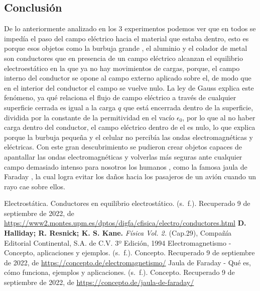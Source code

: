 \documentclass[]{article}
\begin{document}
\begin{multicols*}{2}


\section*{Conclusión}
De lo anteriormente analizado en los 3 experimentos podemos ver que en todos se impedía el paso del campo eléctrico hacia el material que estaba dentro, esto es porque esos objetos como la burbuja grande , el aluminio y el colador de metal son conductores que en presencia de un campo eléctrico alcanzan el equilibrio electroestático en la que ya no hay movimientos de cargas, porque, el campo interno del conductor se opone al campo externo aplicado sobre el, de modo que en el interior del conductor el campo se vuelve nulo.
La ley de Gauss explica este fenómeno, ya qué relaciona el flujo de campo eléctrico a través de cualquier superficie cerrada es igual a la carga $q$ que está encerrada dentro de la superficie, dividida por la constante de la permitividad en el vacío $\epsilon_0$, por lo que al no haber carga dentro del conductor, el campo eléctrico dentro de el es nulo, lo que explica porque la burbuja pequeña y el celular no percibía las ondas electromagnéticas y eléctricas.
Con este gran descubrimiento se pudieron crear objetos capaces de apantallar las ondas electromagnéticas y volverlas más seguras ante cualquier campo demasiado intenso para nosotros los humanos , como la famosa jaula de Faraday , la cual logra evitar los daños hacia los pasajeros de un avión cuando un rayo cae sobre ellos.


\end{multicols*}



\begin{thebibliography}{5}
      Electrostática. Conductores en equilibrio electrostático. (s. f.). Recuperado 9 de septiembre de 2022, 
    de \url{https://www2.montes.upm.es/dptos/digfa/cfisica/electro/conductores.html}
     \textbf{D. Halliday; R. Resnick; K. S. Kane.} \textit{Física Vol. 2.} (Cap.29), Compañía Editorial Continental, S.A. de C.V. 3º Edición, 1994
    Electromagnetismo - Concepto, aplicaciones y ejemplos. (s. f.). Concepto. Recuperado 9 de septiembre de 2022, 
    de \url{https://concepto.de/electromagnetismo/}
    Jaula de Faraday - Qué es, cómo funciona, ejemplos y aplicaciones. (s. f.). Concepto. Recuperado 9 de septiembre de 2022, 
    de \url{https://concepto.de/jaula-de-faraday/}
\end{thebibliography}
\end{document}
